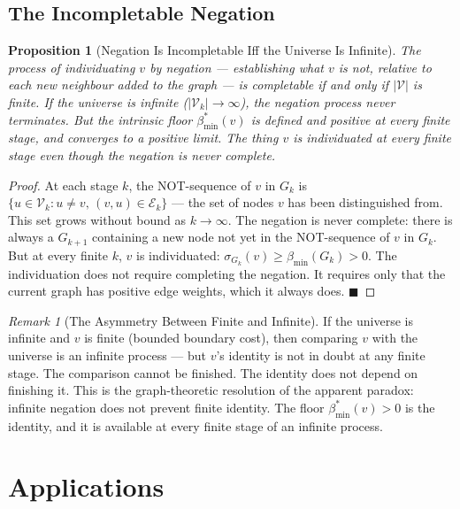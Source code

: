 \documentclass[11pt,twocolumn,a4paper]{article}
\theoremstyle{plain}
\newtheorem{proposition}[theorem]{Proposition}
\theoremstyle{definition}
\theoremstyle{remark}
\newtheorem{remark}[theorem]{Remark}
\newcommand{\Ecal}{\mathcal{E}}
\newcommand{\Vcal}{\mathcal{V}}
\newcommand{\bmin}{\beta_{\min}}
\renewcommand{\qed}{\hfill$\blacksquare$}
\begin{document}
\subsection{The Incompletable Negation}

\begin{proposition}[Negation Is Incompletable Iff the Universe Is Infinite]
\label{prop:incompletable}
The process of individuating $v$ by negation --- establishing what $v$ is not,
relative to each new neighbour added to the graph --- is completable if and
only if $|\Vcal|$ is finite. If the universe is infinite ($|\Vcal_k| \to
\infty$), the negation process never terminates. But the intrinsic floor
$\bmin^*(v)$ is defined and positive at every finite stage, and converges
to a positive limit. The thing $v$ is individuated at every finite stage
even though the negation is never complete.
\end{proposition}

\begin{proof}
At each stage $k$, the NOT-sequence of $v$ in $G_k$ is
$\{u \in \Vcal_k : u \neq v,\, (v,u) \in \Ecal_k\}$ --- the set of nodes
$v$ has been distinguished from. This set grows without bound as $k \to
\infty$. The negation is never complete: there is always a $G_{k+1}$
containing a new node not yet in the NOT-sequence of $v$ in $G_k$. But at
every finite $k$, $v$ is individuated: $\sigma_{G_k}(v) \geq \bmin(G_k) > 0$.
The individuation does not require completing the negation. It requires only
that the current graph has positive edge weights, which it always does. \qed
\end{proof}

\begin{remark}[The Asymmetry Between Finite and Infinite]
If the universe is infinite and $v$ is finite (bounded boundary cost), then
comparing $v$ with the universe is an infinite process --- but $v$'s identity
is not in doubt at any finite stage. The comparison cannot be finished. The
identity does not depend on finishing it. This is the graph-theoretic resolution
of the apparent paradox: infinite negation does not prevent finite identity.
The floor $\bmin^*(v) > 0$ is the identity, and it is available at every
finite stage of an infinite process.
\end{remark}

\section{Applications}
\label{sec:applications}
\end{document}
